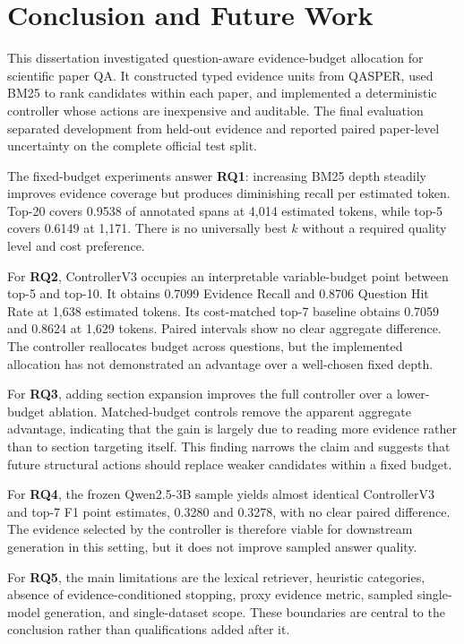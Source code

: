 \chapter{Conclusion and Future Work}
\label{chap:conclusion}

This dissertation investigated question-aware evidence-budget allocation for scientific paper QA. It constructed typed evidence units from QASPER, used BM25 to rank candidates within each paper, and implemented a deterministic controller whose actions are inexpensive and auditable. The final evaluation separated development from held-out evidence and reported paired paper-level uncertainty on the complete official test split.

The fixed-budget experiments answer \textbf{RQ1}: increasing BM25 depth steadily improves evidence coverage but produces diminishing recall per estimated token. Top-20 covers 0.9538 of annotated spans at 4,014 estimated tokens, while top-5 covers 0.6149 at 1,171. There is no universally best $k$ without a required quality level and cost preference.

For \textbf{RQ2}, ControllerV3 occupies an interpretable variable-budget point between top-5 and top-10. It obtains 0.7099 Evidence Recall and 0.8706 Question Hit Rate at 1,638 estimated tokens. Its cost-matched top-7 baseline obtains 0.7059 and 0.8624 at 1,629 tokens. Paired intervals show no clear aggregate difference. The controller reallocates budget across questions, but the implemented allocation has not demonstrated an advantage over a well-chosen fixed depth.

For \textbf{RQ3}, adding section expansion improves the full controller over a lower-budget ablation. Matched-budget controls remove the apparent aggregate advantage, indicating that the gain is largely due to reading more evidence rather than to section targeting itself. This finding narrows the claim and suggests that future structural actions should replace weaker candidates within a fixed budget.

For \textbf{RQ4}, the frozen Qwen2.5-3B sample yields almost identical ControllerV3 and top-7 F1 point estimates, 0.3280 and 0.3278, with no clear paired difference. The evidence selected by the controller is therefore viable for downstream generation in this setting, but it does not improve sampled answer quality.

For \textbf{RQ5}, the main limitations are the lexical retriever, heuristic categories, absence of evidence-conditioned stopping, proxy evidence metric, sampled single-model generation, and single-dataset scope. These boundaries are central to the conclusion rather than qualifications added after it.

